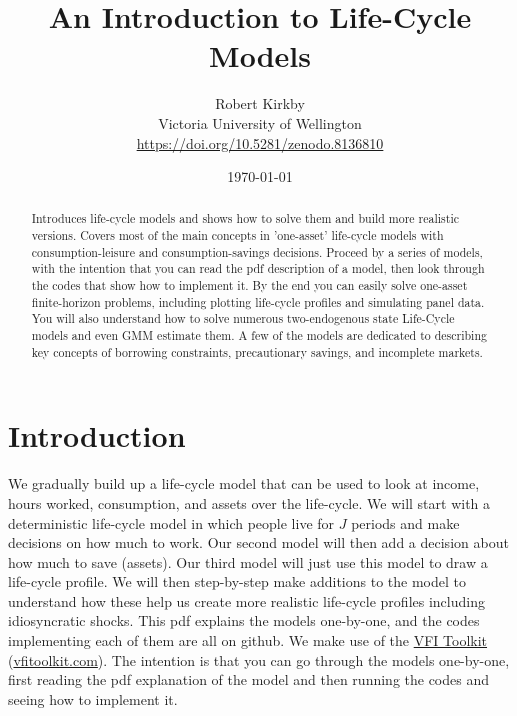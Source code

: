 \documentclass[11pt]{article}%
\begin{document}
\title{An Introduction to Life-Cycle Models}
\author{Robert Kirkby \\ Victoria University of Wellington
\\ \href{https://doi.org/10.5281/zenodo.8136810}{https://doi.org/10.5281/zenodo.8136810}
}
\date{\today \\ }
\maketitle

\vspace{-10mm}
\begin{abstract}
Introduces life-cycle models and shows how to solve them and build more realistic versions. Covers most of the main concepts in 'one-asset' life-cycle models with consumption-leisure and consumption-savings decisions. Proceed by a series of models, with the intention that you can read the pdf description of a model, then look through the codes that show how to implement it. By the end you can easily solve one-asset finite-horizon problems, including plotting life-cycle profiles and simulating panel data. You will also understand how to solve numerous two-endogenous state Life-Cycle models and even GMM estimate them. A few of the models are dedicated to describing key concepts of borrowing constraints, precautionary savings, and incomplete markets.
\end{abstract}
\small



\section{Introduction}
We gradually build up a life-cycle model that can be used to look at income, hours worked, consumption, and assets over the life-cycle. We will start with a deterministic life-cycle model in which people live for $J$ periods and make decisions on how much to work. Our second model will then add a decision about how much to save (assets). Our third model will just use this model to draw a life-cycle profile. We will then step-by-step make additions to the model to understand how these help us create more realistic life-cycle profiles including idiosyncratic shocks. This pdf explains the models one-by-one, and the codes implementing each of them are all on github. We make use of the \href{https://www.vfitoolkit.com/}{VFI Toolkit} (\href{https://www.vfitoolkit.com/}{vfitoolkit.com}). The intention is that you can go through the models one-by-one, first reading the pdf explanation of the model and then running the codes and seeing how to implement it.
\end{document}
